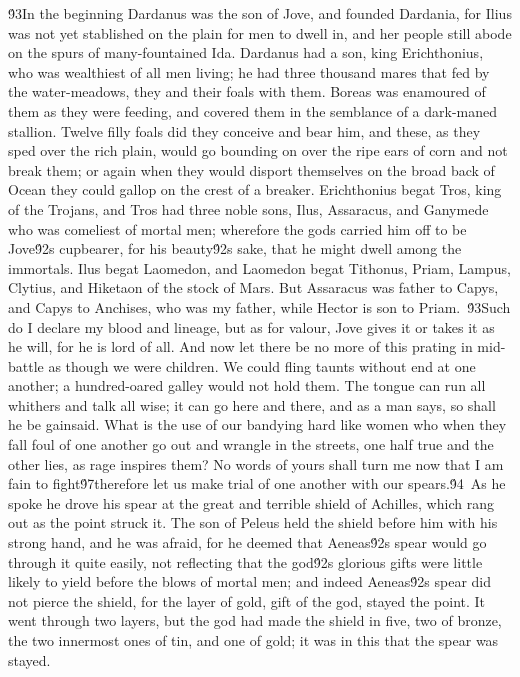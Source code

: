 {\'93In the beginning Dardanus was the son of Jove, and founded Dardania, for Ilius was not yet stablished on the plain for men to dwell in, and her people still abode on the spurs of many-fountained Ida. Dardanus had a son, king Erichthonius, who was wealthiest of all men living; he had three thousand mares that fed by the water-meadows, they and their foals with them. Boreas was enamoured of them as they were feeding, and covered them in the semblance of a dark-maned stallion. Twelve filly foals did they conceive and bear him, and these, as they sped over the rich plain, would go bounding on over the ripe ears of corn and not break them; or again when they would disport themselves on the broad back of Ocean they could gallop on the crest of a breaker. Erichthonius begat Tros, king of the Trojans, and Tros had three noble sons, Ilus, Assaracus, and Ganymede who was comeliest of mortal men; wherefore the gods carried him off to be Jove\'92s cupbearer, for his beauty\'92s sake, that he might dwell among the immortals. Ilus begat Laomedon, and Laomedon begat Tithonus, Priam, Lampus, Clytius, and Hiketaon of the stock of Mars. But Assaracus was father to Capys, and Capys to Anchises, who was my father, while Hector is son to Priam.\
\'93Such do I declare my blood and lineage, but as for valour, Jove gives it or takes it as he will, for he is lord of all. And now let there be no more of this prating in mid-battle as though we were children. We could fling taunts without end at one another; a hundred-oared galley would not hold them. The tongue can run all whithers and talk all wise; it can go here and there, and as a man says, so shall he be gainsaid. What is the use of our bandying hard like women who when they fall foul of one another go out and wrangle in the streets, one half true and the other lies, as rage inspires them? No words of yours shall turn me now that I am fain to fight\'97therefore let us make trial of one another with our spears.\'94\
As he spoke he drove his spear at the great and terrible shield of Achilles, which rang out as the point struck it. The son of Peleus held the shield before him with his strong hand, and he was afraid, for he deemed that Aeneas\'92s spear would go through it quite easily, not reflecting that the god\'92s glorious gifts were little likely to yield before the blows of mortal men; and indeed Aeneas\'92s spear did not pierce the shield, for the layer of gold, gift of the god, stayed the point. It went through two layers, but the god had made the shield in five, two of bronze, the two innermost ones of tin, and one of gold; it was in this that the spear was stayed.\
}
